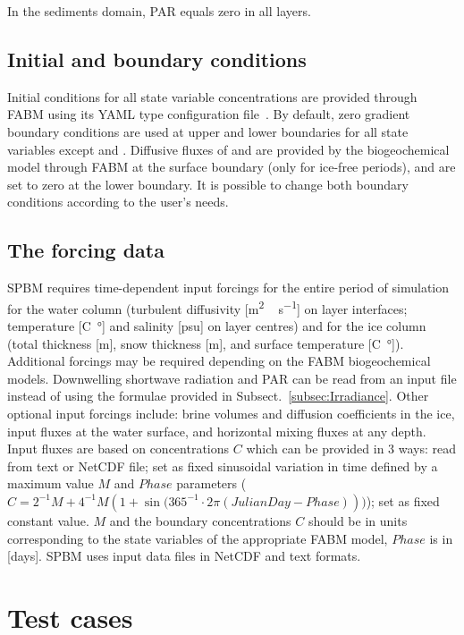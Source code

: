 \documentclass[gmd, manuscript]{copernicus}
\begin{document}
In the sediments domain, \textrm{PAR} equals zero in all layers.

\subsection{Initial and boundary conditions}
Initial conditions for all state variable concentrations are provided through \textrm{FABM} using its \textrm{YAML} type configuration file~\citep{Bruggeman2014}.
By default, zero gradient boundary conditions are used at upper and lower boundaries for all state variables except  and .
Diffusive fluxes of  and  are provided by the biogeochemical model through \textrm{FABM} at the surface boundary (only for ice-free periods), and are set to zero at the lower boundary.
It is possible to change both boundary conditions according to the user's needs.

\subsection{The forcing data}
\label{subsec:Hydrodynamic}
\textrm{SPBM} requires time-dependent input forcings for the entire period of simulation for the water column (turbulent diffusivity [\unit{m^{2}\,s^{-1}}] on layer interfaces; temperature [\unit{C\degree}] and salinity [\unit{psu}] on layer centres) and for the ice column (total thickness [\unit{m}], snow thickness [\unit{m}], and surface temperature [\unit{C\degree}]).
Additional forcings may be required depending on the \textrm{FABM} biogeochemical models.
Downwelling shortwave radiation and \textrm{PAR} can be read from an input file instead of using the formulae provided in Subsect.~\ref{subsec:Irradiance}.
Other optional input forcings include: brine volumes and diffusion coefficients in the ice, input fluxes at the water surface, and horizontal mixing fluxes at any depth.
Input fluxes are based on concentrations $C$ which can be provided in 3 ways:
read from text or \textrm{NetCDF} file;
set as fixed sinusoidal variation in time defined by a maximum value $M$ and $Phase$ parameters ($C = 2^{-1} M + 4^{-1} M (1 + \sin{(365^{-1} \cdot 2 \pi (JulianDay - Phase)}))$);
set as fixed constant value.
$M$ and the boundary concentrations $C$ should be in units corresponding to the state variables of the appropriate \textrm{FABM} model, $Phase$ is in [\unit{days}].
\textrm{SPBM} uses input data files in \textrm{NetCDF} and text formats.

\section{Test cases}
\end{document}

